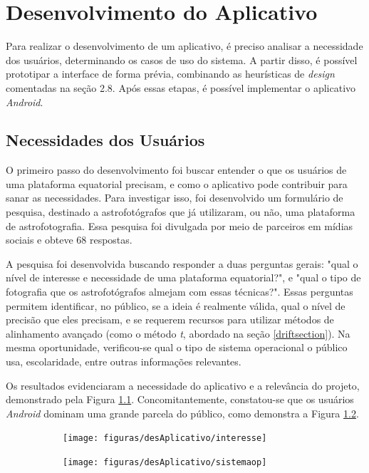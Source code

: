 \chapter{Desenvolvimento do Aplicativo}

Para realizar o desenvolvimento de um aplicativo, é preciso analisar a necessidade dos usuários, determinando os casos de uso do sistema. A partir disso, é possível prototipar a interface de forma prévia, combinando as heurísticas de \textit{design} comentadas na seção 2.8. Após essas etapas, é possível implementar o aplicativo \textit{Android}.

\section{Necessidades dos Usuários}

O primeiro passo do desenvolvimento foi buscar entender o que os usuários de uma plataforma equatorial precisam, e como o aplicativo pode contribuir para sanar as necessidades. Para investigar isso, foi desenvolvido um formulário de pesquisa, destinado a astrofotógrafos que já utilizaram, ou não, uma plataforma de astrofotografia. Essa pesquisa foi divulgada por meio de parceiros em mídias sociais e obteve 68 respostas.

A pesquisa foi desenvolvida buscando responder a duas perguntas gerais: "qual o nível de interesse e necessidade de uma plataforma equatorial?", e "qual o tipo de fotografia que os astrofotógrafos almejam com essas técnicas?". Essas perguntas permitem identificar, no público, se a ideia é realmente válida, qual o nível de precisão que eles precisam, e se requerem recursos para utilizar métodos de alinhamento avançado (como o método \textit{t}, abordado na seção \ref{driftsection}). Na mesma oportunidade, verificou-se qual o tipo de sistema operacional o público usa, escolaridade, entre outras informações relevantes.
 
Os resultados evidenciaram a necessidade do aplicativo e a relevância do projeto, demonstrado pela Figura \ref{fig:resultadoapp}. Concomitantemente, constatou-se que os usuários \textit{Android} dominam uma grande parcela do público, como demonstra a Figura \ref{fig:usuariosandroid}. 


\begin{figure}[!htb]
	\centering
	\captionsetup[subfigure]{justification=centering}
	\caption{Resultados do Formulário de Pesquisa com Usuários. (a) Interesse dos astrofotógrafos no aplicativo. (b) Sistema operacional usado}
	\begin{subfigure}[b]{0.58\textwidth}
		\centering
		\texttt{[image: figuras/desAplicativo/interesse]}
		\caption{}
		\label{fig:resultadoapp}
	\end{subfigure}
	\hfill
	\begin{subfigure}[b]{0.41\textwidth}
		\centering
		\texttt{[image: figuras/desAplicativo/sistemaop]}
		\caption{}
		\label{fig:usuariosandroid}
	\end{subfigure}
	\label{fig:resultadosforms}
\end{figure}

